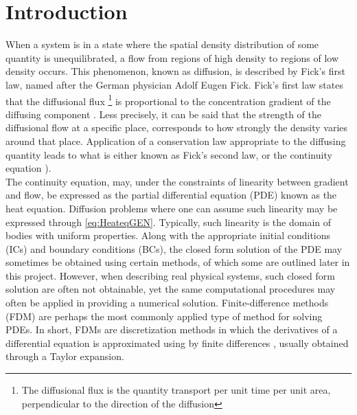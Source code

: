 \documentclass[%
oneside,                 %
final,                   %
10pt]{article}
\begin{document}
\newpage

\section{Introduction}
When a system is in a state where the spatial density distribution of some quantity is unequilibrated, a flow from regions of high density to regions of low density occurs. This phenomenon, known as diffusion, is described by Fick's first law, named after the German physician Adolf Eugen Fick. Fick's first law states that the diffusional flux \footnote{The diffusional flux is the quantity transport per unit time per unit area, perpendicular to the direction of the diffusion} is proportional to the concentration gradient of the diffusing component \citep[pp. 339-340]{MatSci}. Less precisely, it can be said that the strength of the diffusional flow at a specific place, corresponds to how strongly the density varies around that place. Application of a conservation law appropriate to the diffusing quantity leads to what is either known as Fick's second law, or the continuity equation \citep[pp.341-342]{MatSci}). \\
The continuity equation, may, under the constraints of linearity between gradient and flow, be expressed as the partial differential equation (PDE) known as the heat equation. Diffusion problems where one can assume such linearity may be expressed through \eqref{eq:HeateqGEN}. Typically, such linearity is the domain of bodies with uniform properties. Along with the appropriate initial conditions (ICs) and boundary conditions (BCs), the closed form solution of the PDE may sometimes be obtained using certain methods, of which some are outlined later in this project. However, when describing real physical systems, such closed form solution are often not obtainable, yet the same computational procedures may often be applied in providing a numerical solution. Finite-difference methods (FDM) are perhaps the most commonly applied type of method for solving PDEs. In short, FDMs are discretization methods in which the derivatives of a differential equation is approximated using by finite differences \citep[p. 46]{compPDE}, usually obtained through a Taylor expansion. 
\end{document}
